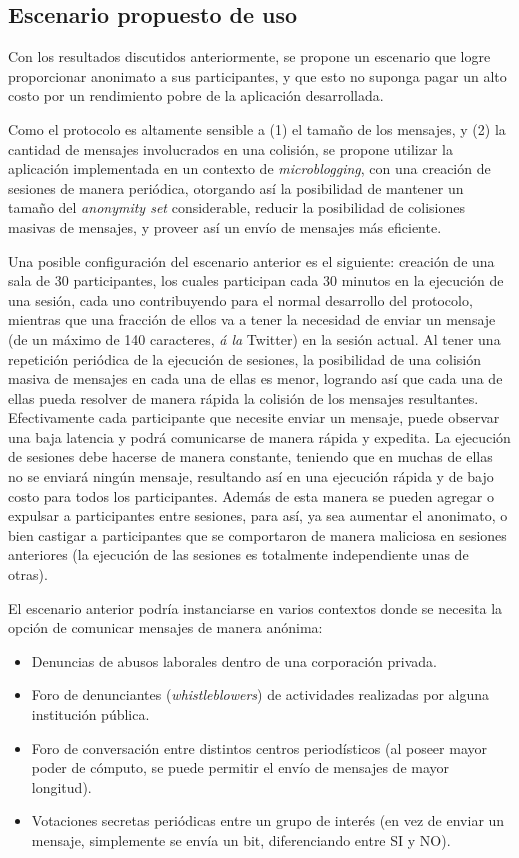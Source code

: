 \subsection{Escenario propuesto de uso}

Con los resultados discutidos anteriormente, se propone un escenario que logre 
proporcionar anonimato a sus participantes, y que esto no suponga pagar un 
alto costo por un rendimiento pobre de la aplicación desarrollada.

Como el protocolo es altamente sensible a (1) el tamaño de los mensajes, y (2) 
la cantidad de mensajes involucrados en una colisión, se propone utilizar la 
aplicación implementada en un contexto de \emph{microblogging}, con una 
creación de sesiones de manera periódica, otorgando así la posibilidad de 
mantener un tamaño del \emph{anonymity set} considerable, reducir la 
posibilidad de colisiones masivas de mensajes, y proveer así un envío de 
mensajes más eficiente.

Una posible configuración del escenario anterior es el siguiente: creación de 
una sala de 30 participantes, los cuales participan cada 30 minutos en la 
ejecución de una sesión, cada uno contribuyendo para el normal desarrollo del 
protocolo, mientras que una fracción de ellos va a tener la necesidad de 
enviar un mensaje (de un máximo de 140 caracteres, \emph{á la} Twitter) en la 
sesión actual. Al tener una repetición periódica de la ejecución de sesiones, 
la posibilidad de una colisión masiva de mensajes en cada una de ellas es 
menor, logrando así que cada una de ellas pueda resolver de manera rápida la 
colisión de los mensajes resultantes. Efectivamente cada participante que 
necesite enviar un mensaje, puede observar una baja latencia y podrá 
comunicarse de manera rápida y expedita. La ejecución de sesiones 
debe hacerse de manera constante, teniendo que en muchas de ellas no se 
enviará ningún mensaje, resultando así en una ejecución rápida y de bajo costo 
para todos los participantes. Además de esta manera se pueden agregar o 
expulsar a participantes entre sesiones, para así, ya sea aumentar el 
anonimato, o bien castigar a participantes que se comportaron de manera 
maliciosa en sesiones anteriores (la ejecución de las sesiones es totalmente 
independiente unas de otras).

El escenario anterior podría instanciarse en varios contextos donde se 
necesita la opción de comunicar mensajes de manera anónima:
\begin{itemize}
	\item Denuncias de abusos laborales dentro de una corporación privada.
	\item Foro de denunciantes (\emph{whistleblowers}) de actividades 
	realizadas por alguna institución pública.
	\item Foro de conversación entre distintos centros periodísticos (al 
	poseer mayor poder de cómputo, se puede permitir el envío de mensajes de 
	mayor longitud).
	\item Votaciones secretas periódicas entre un grupo de interés (en vez de 
	enviar un mensaje, 
	simplemente se envía un bit, diferenciando entre SI y NO).
\end{itemize} 